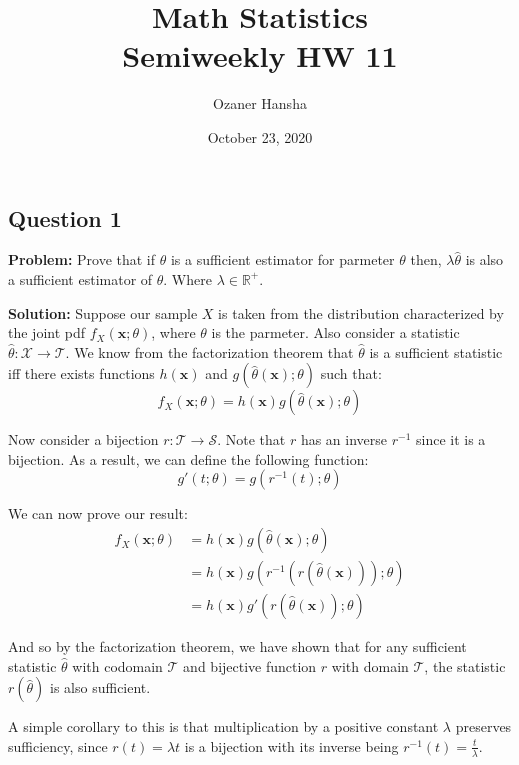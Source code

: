 \documentclass{article}
\renewcommand{\vec}[1]{\mathbf{#1}}
\begin{document}
\title{Math Statistics\\ Semiweekly HW 11}
\author{Ozaner Hansha}
\date{October 23, 2020}
\maketitle

\subsection*{Question 1}
\noindent\textbf{Problem:} Prove that if $\hat\theta$ is a sufficient estimator for parmeter $\theta$ then, $\lambda\hat\theta$ is also a sufficient estimator of $\theta$. Where $\lambda\in\mathbb R^+$.
\bigskip

\noindent\textbf{Solution:} Suppose our sample $X$ is taken from the distribution characterized by the joint pdf $f_X(\vec x;\theta)$, where $\theta$ is the parmeter. Also consider a statistic $\hat\theta:\mathcal X\to\mathcal T$. We know from the factorization theorem that $\hat\theta$ is a sufficient statistic iff there exists functions $h(\vec x)$ and $g(\hat\theta(\vec x);\theta)$ such that:
$$f_X(\vec x;\theta)=h(\vec x)g(\hat\theta(\vec x);\theta)$$

Now consider a bijection $r:\mathcal T\to\mathcal S$. Note that $r$ has an inverse $r^{-1}$ since it is a bijection. As a result, we can define the following function:
$$g'(t;\theta)=g(r^{-1}(t);\theta)$$

We can now prove our result:
\begin{align*}
    f_X(\vec x;\theta)&=h(\vec x)g(\hat\theta(\vec x);\theta)\tag{$\hat\theta$ is sufficient}\\
    &=h(\vec x)g(r^{-1}(r(\hat\theta(\vec x)));\theta)\\
    &=h(\vec x)g'(r(\hat\theta(\vec x));\theta)
\end{align*}

And so by the factorization theorem, we have shown that for any sufficient statistic $\hat\theta$ with codomain $\mathcal T$ and bijective function $r$ with domain $\mathcal T$, the statistic $r(\hat\theta)$ is also sufficient.

A simple corollary to this is that multiplication by a positive constant $\lambda$ preserves sufficiency, since $r(t)=\lambda t$ is a bijection with its inverse being $r^{-1}(t)=\frac{t}{\lambda}$.
\end{document}
